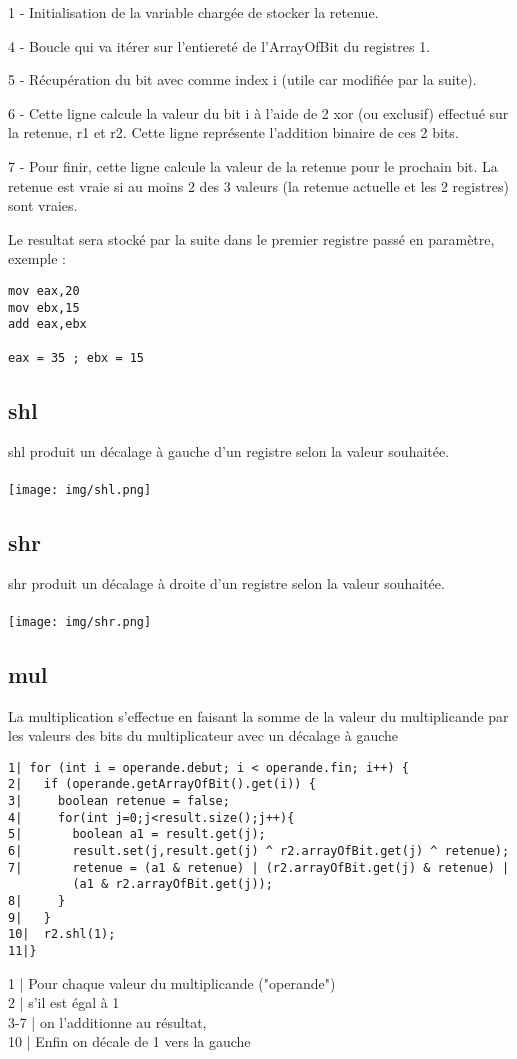 \documentclass{article}
\begin{document}
1 - Initialisation de la variable chargée de stocker la retenue.

4 - Boucle qui va itérer sur l'entiereté de l'ArrayOfBit du registres 1.

5 - Récupération du bit avec comme index i (utile car modifiée par la suite).

6 - Cette ligne calcule la valeur du bit i à l'aide de 2 xor (ou exclusif) effectué sur la retenue, r1 et r2.
Cette ligne représente l'addition binaire de ces 2 bits.

7 - Pour finir, cette ligne calcule la valeur de la retenue pour le prochain bit.
La retenue est vraie si au moins 2 des 3 valeurs (la retenue actuelle et les 2 registres) sont vraies.

Le resultat sera stocké par la suite dans le premier registre passé en paramètre, exemple :
\begin{verbatim}
mov eax,20
mov ebx,15
add eax,ebx

eax = 35 ; ebx = 15
\end{verbatim}

\newpage
\subsection{shl}
shl produit un décalage à gauche d'un registre selon la valeur souhaitée.
\\
\\
\texttt{[image: img/shl.png]}

\subsection{shr}
shr produit un décalage à droite d'un registre selon la valeur souhaitée.
\\
\\
\texttt{[image: img/shr.png]}
\newpage
\subsection{mul}
La multiplication s'effectue en faisant la somme de la valeur du multiplicande par les valeurs des bits du multiplicateur avec un décalage à gauche
\begin{verbatim}
1| for (int i = operande.debut; i < operande.fin; i++) {
2|   if (operande.getArrayOfBit().get(i)) {
3|     boolean retenue = false;
4|     for(int j=0;j<result.size();j++){
5|       boolean a1 = result.get(j);
6|       result.set(j,result.get(j) ^ r2.arrayOfBit.get(j) ^ retenue);
7|       retenue = (a1 & retenue) | (r2.arrayOfBit.get(j) & retenue) |
         (a1 & r2.arrayOfBit.get(j));
8|     }
9|   }
10|  r2.shl(1);
11|}
\end{verbatim}
1 | Pour chaque valeur du multiplicande ("operande")\\
2 | s'il est égal à 1\\
3-7 | on l'additionne au résultat,\\
10 | Enfin on décale de 1 vers la gauche\\
\end{document}
